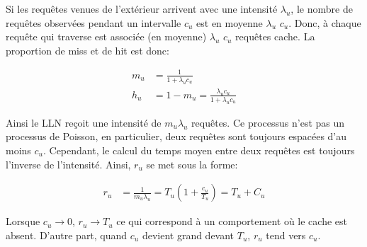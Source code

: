 Si les requêtes venues de l'extérieur arrivent avec une intensité $\lambda_u$, le nombre de requêtes observées pendant un intervalle $c_u$ est en moyenne $\lambda_u$ $c_u$.
Donc, à chaque requête qui traverse est associée (en moyenne) $\lambda_u$ $c_u$ requêtes cache.
La proportion de miss et de hit est donc:

\begin{align}
  m_u &= \frac{1}{1 + \lambda_u c_u}
  \label{cache:eq:cache_miss}\\
  h_u &= 1 - m_u = \frac{\lambda_u c_u}{1 + \lambda_u c_u}
  \label{cache:eq:cache_hit}
\end{align}
 
Ainsi le \ac{LLN} reçoit une intensité de $m_u \lambda_u$ requêtes.
Ce processus n'est pas un processus de Poisson, en particulier, deux requêtes sont toujours espacées d'au moins $c_u$.
Cependant, le calcul du temps moyen entre deux requêtes est toujours l'inverse de l'intensité.
Ainsi, $r_u$ se met sous la forme:

\begin{align}
  r_u &= \frac{1}{m_u \lambda_u} = T_u \left (1 + \frac{c_u}{T_u} \right) = T_u + C_u 
  \label{cache:eq:r_u}
\end{align}

Lorsque $c_u \rightarrow 0$, $r_u \rightarrow T_u$ ce qui correspond à un comportement où le cache est absent.
D'autre part, quand $c_u$ devient grand devant $T_u$, $r_u$ tend vers $c_u$.






%   


